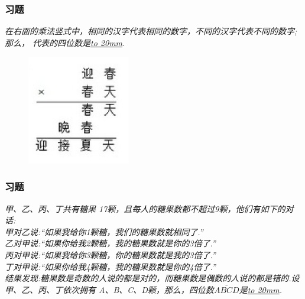 \begin{frame}
    \frametitle{习题\theframecounter}
    \textit{在右面的乘法竖式中，相同的汉字代表相同的数字，不同的汉字代表不同的数字;那么， 代表的四位数是\underline{\hbox to 20mm{}}.}
    \begin{figure}[H] 
        \centering
        \includegraphics[width=0.4\textwidth]{./pics/Chapter_7/14.png}
    \end{figure}
\end{frame}

\begin{frame}
    \frametitle{习题\theframecounter}
    \vspace*{-1cm}
    \textit{甲、乙、丙、丁共有糖果 17颗，且每人的糖果数都不超过9颗，他们有如下的对话:\\
    甲对乙说:``如果我给你1颗糖，我们的糖果数就相同了.''\\
    乙对甲说:``如果你给我2颗糖，我的糖果数就是你的3倍了.''\\
    丙对甲说:``如果我给你3颗糖，你的糖果数就是我的3倍了.''\\
    丁对甲说:``如果你给我4颗糖，我的糖果数就是你的4倍了.''\\
    结果发现:糖果数是奇数的人说的都是对的，而糖果数是偶数的人说的都是错的.设甲、乙、丙、丁依次拥有 A、B、C、D颗，那么，四位数$\overline{ABCD}$是\underline{\hbox to 20mm{}}.}
\end{frame}